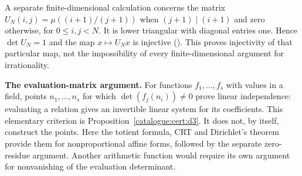 A separate finite-dimensional calculation concerns the matrix
$U_N(i,j)=\mu((i+1)/(j+1))$ when $(j+1)\mid(i+1)$ and zero otherwise,
for $0\le i,j<N$. It is lower triangular with diagonal entries one.
Hence $\det U_N=1$ and the map $x\mapsto U_Nx$ is injective
().
This proves injectivity of that particular map, not the impossibility
of every finite-dimensional argument for irrationality.

\textbf{The evaluation-matrix argument.}
For functions $f_1,\ldots,f_s$ with values in a field, points
$n_1,\ldots,n_s$ for which $\det(f_j(n_i))\ne0$ prove linear
independence: evaluating a relation gives an invertible linear system
for its coefficients. This elementary criterion is
Proposition~\ref{catalogue:cert:d3}.
It does not, by itself, construct the points. Here the totient formula,
CRT and Dirichlet's theorem provide them for nonproportional affine
forms, followed by the separate zero-residue argument. Another
arithmetic function would require its own argument for nonvanishing
of the evaluation determinant.

